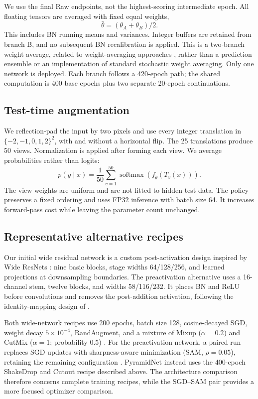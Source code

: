\documentclass[letterpaper]{article}
\begin{document}
We use the final Raw endpoints, not the highest-scoring intermediate epoch. All floating tensors are averaged with fixed equal weights,
\[
 \bar\theta=(\theta_A+\theta_B)/2.
\]
This includes BN running means and variances. Integer buffers are retained from branch B, and no subsequent BN recalibration is applied. This is a two-branch weight average, related to weight-averaging approaches \citep{izmailov2018averaging}, rather than a prediction ensemble or an implementation of standard stochastic weight averaging. Only one network is deployed. Each branch follows a 420-epoch path; the shared computation is 400 base epochs plus two separate 20-epoch continuations.

\subsection{Test-time augmentation}
We reflection-pad the input by two pixels and use every integer translation in $\{-2,-1,0,1,2\}^2$, with and without a horizontal flip. The 25 translations produce 50 views. Normalization is applied after forming each view. We average probabilities rather than logits:
\[
 p(y\mid x)=\frac1{50}\sum_{v=1}^{50}
 \operatorname{softmax}(f_{\bar\theta}(T_v(x))).
\]
The view weights are uniform and are not fitted to hidden test data. The policy preserves a fixed ordering and uses FP32 inference with batch size 64. It increases forward-pass cost while leaving the parameter count unchanged.

\subsection{Representative alternative recipes}
Our initial wide residual network is a custom post-activation design inspired by Wide ResNets \citep{zagoruyko2016wide}: nine basic blocks, stage widths 64/128/256, and learned projections at downsampling boundaries. The preactivation alternative uses a 16-channel stem, twelve blocks, and widths 58/116/232. It places BN and ReLU before convolutions and removes the post-addition activation, following the identity-mapping design of \citet{he2016identity}.

Both wide-network recipes use 200 epochs, batch size 128, cosine-decayed SGD, weight decay $5\times10^{-4}$, RandAugment, and a mixture of Mixup ($\alpha=0.2$) and CutMix ($\alpha=1$; probability 0.5) \citep{zhang2018mixup,yun2019cutmix}. For the preactivation network, a paired run replaces SGD updates with sharpness-aware minimization (SAM, $\rho=0.05$), retaining the remaining configuration \citep{foret2021sam}. PyramidNet instead uses the 400-epoch ShakeDrop and Cutout recipe described above. The architecture comparison therefore concerns complete training recipes, while the SGD--SAM pair provides a more focused optimizer comparison.
\end{document}
